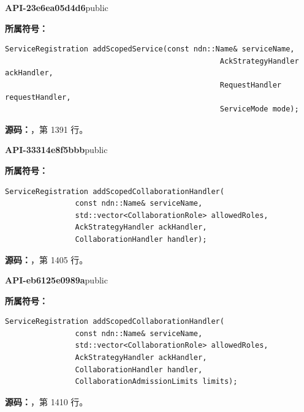 \textbf{API-23e6ea05d4d6}\quad public\par
\textbf{所属符号：}\par
\begin{Verbatim}[fontsize=\footnotesize,breaklines,breakanywhere]
ServiceRegistration addScopedService(const ndn::Name& serviceName,
                                                 AckStrategyHandler ackHandler,
                                                 RequestHandler requestHandler,
                                                 ServiceMode mode);
\end{Verbatim}
\textbf{源码：}，第 1391 行。\par

\textbf{API-33314e8f5bbb}\quad public\par
\textbf{所属符号：}\par
\begin{Verbatim}[fontsize=\footnotesize,breaklines,breakanywhere]
ServiceRegistration addScopedCollaborationHandler(
                const ndn::Name& serviceName,
                std::vector<CollaborationRole> allowedRoles,
                AckStrategyHandler ackHandler,
                CollaborationHandler handler);
\end{Verbatim}
\textbf{源码：}，第 1405 行。\par

\textbf{API-eb6125e0989a}\quad public\par
\textbf{所属符号：}\par
\begin{Verbatim}[fontsize=\footnotesize,breaklines,breakanywhere]
ServiceRegistration addScopedCollaborationHandler(
                const ndn::Name& serviceName,
                std::vector<CollaborationRole> allowedRoles,
                AckStrategyHandler ackHandler,
                CollaborationHandler handler,
                CollaborationAdmissionLimits limits);
\end{Verbatim}
\textbf{源码：}，第 1410 行。\par

